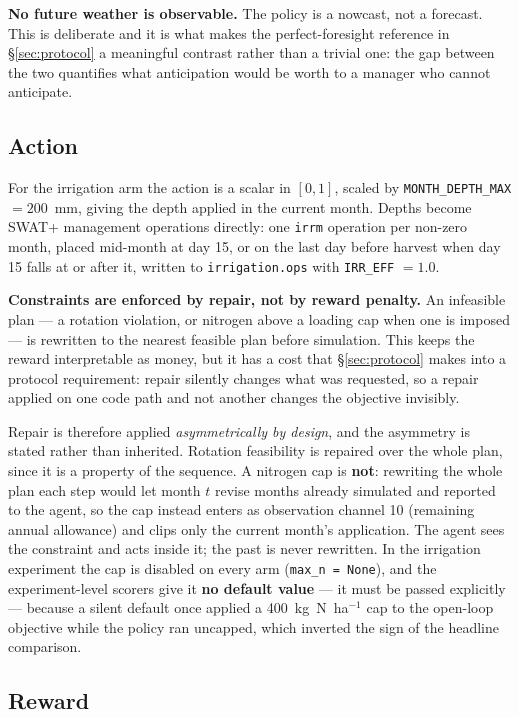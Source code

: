 \documentclass[a4paper,fleqn]{cas-sc}
\begin{document}
\textbf{No future weather is observable.} The policy is a nowcast, not a forecast. This
is deliberate and it is what makes the perfect-foresight reference in
\S\ref{sec:protocol} a meaningful contrast rather than a trivial one: the gap between
the two quantifies what anticipation would be worth to a manager who cannot anticipate.

\subsection{Action}\label{sec:action}

For the irrigation arm the action is a scalar in $[0,1]$, scaled by
\texttt{MONTH\_DEPTH\_MAX} $= 200$~mm, giving the depth applied in the current month.
Depths become SWAT+ management operations directly: one \texttt{irrm} operation per
non-zero month, placed mid-month at day 15, or on the last day before harvest when
day 15 falls at or after it, written to \texttt{irrigation.ops} with
\texttt{IRR\_EFF} $= 1.0$.

\textbf{Constraints are enforced by repair, not by reward penalty.} An infeasible plan
--- a rotation violation, or nitrogen above a loading cap when one is imposed --- is
rewritten to the nearest feasible plan before simulation. This keeps the reward
interpretable as money, but it has a cost that \S\ref{sec:protocol} makes into a
protocol requirement: repair silently changes what was requested, so a repair applied on
one code path and not another changes the objective invisibly.

Repair is therefore applied \emph{asymmetrically by design}, and the asymmetry is stated
rather than inherited. Rotation feasibility is repaired over the whole plan, since it is
a property of the sequence. A nitrogen cap is \textbf{not}: rewriting the whole plan each
step would let month $t$ revise months already simulated and reported to the agent, so
the cap instead enters as observation channel 10 (remaining annual allowance) and clips
only the current month's application. The agent sees the constraint and acts inside it;
the past is never rewritten. In the irrigation experiment the cap is disabled on every
arm (\texttt{max\_n = None}), and the experiment-level scorers give it \textbf{no default
value} --- it must be passed explicitly --- because a silent default once applied a
400~kg~N~ha$^{-1}$ cap to the open-loop objective while the policy ran uncapped, which
inverted the sign of the headline comparison.

\subsection{Reward}\label{sec:reward}
\end{document}
